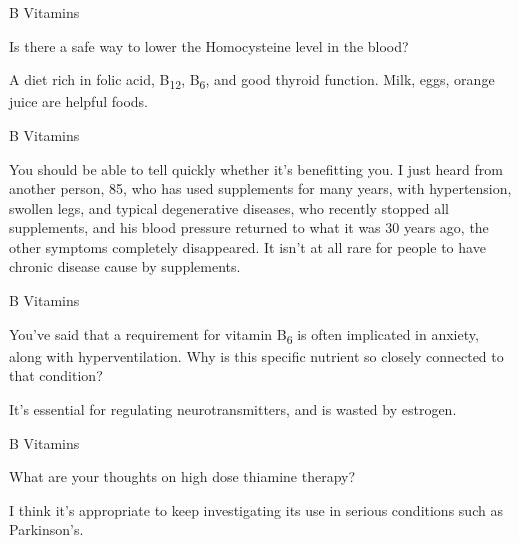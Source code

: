 \documentclass[11pt,oneside,openany,extrafontsizes]{memoir}
\begin{document}
\begin{qaexchange}{B Vitamins}

    \begin{question}
        Is there a safe way to lower the Homocysteine level in the blood?
    \end{question}

    \begin{answer}
       A diet rich in folic acid, B\textsubscript{12}, B\textsubscript{6}, and good thyroid function. Milk, eggs, orange juice are helpful foods.
    \end{answer}
\end{qaexchange}

\begin{standalonequote}{B Vitamins}

    \begin{answer}
       You should be able to tell quickly whether it's benefitting you. I just heard from another person, 85, who has used supplements for many years, with hypertension, swollen legs, and typical degenerative diseases, who recently stopped all supplements, and his blood pressure returned to what it was 30 years ago, the other symptoms completely disappeared. It isn't at all rare for people to have chronic disease cause by supplements. 
    \end{answer}
\end{standalonequote}

\begin{qaexchange}{B Vitamins}

    \begin{question}
        You've said that a requirement for vitamin B\textsubscript{6} is often implicated in anxiety, along with hyperventilation. Why is this specific nutrient so closely connected to that condition?
    \end{question}

    \begin{answer}
       It's essential for regulating neurotransmitters, and is wasted by estrogen.
    \end{answer}
\end{qaexchange}

\begin{qaexchange}{B Vitamins}

    \begin{question}
        What are your thoughts on high dose thiamine therapy?
    \end{question}

    \begin{answer}
      I think it's appropriate to keep investigating its use in serious conditions such as Parkinson's.
    \end{answer}
\end{qaexchange}
\end{document}
